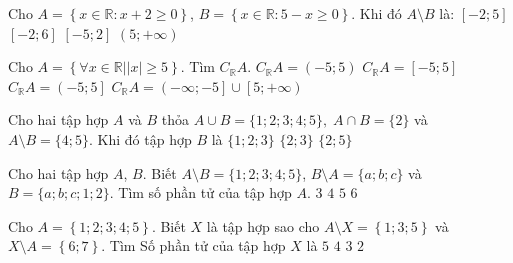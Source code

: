 \begin{ex}%
	Cho $A=\left\{x\in \mathbb{R}:x+2\geq 0\right\}$, $B=\left\{x\in \mathbb{R}:5-x\geq 0\right\}$. Khi đó $A\setminus B$ là:
	\choice
	{$\left[-2;5\right]$}
	{$\left[-2;6\right]$}
	{$\left[-5;2\right]$}
	{\True $\left(5;+\infty\right)$}
\end{ex}

\begin{ex}%
	Cho $A=\left\{\forall x\in\mathbb{R}|\left| x\right|\geq 5\right\}$. Tìm $C_{\mathbb{R}}A$.
	\choice
	{\True $C_{\mathbb{R}}A=\left(-5;5\right)$}
	{$C_{\mathbb{R}}A=\left[-5;5\right]$}
	{$C_{\mathbb{R}}A=\left(-5;5\right]$}
	{$C_{\mathbb{R}}A=\left(-\infty;-5\right]\cup\left[5;+\infty\right)$}
	\loigiai{
		Ta có $A=\left(-\infty ;-5\right]\cup\left[5;+\infty\right)\Rightarrow C_{\mathbb{R}}A=\left(-5;5\right)$.
	}
\end{ex}

\begin{ex}
Cho hai tập hợp $A$ và $B$ thỏa $A \cup B = \lbrace 1;2;3;4;5 \rbrace,\; A\cap B = \lbrace 2 \rbrace$ và $A \setminus B = \lbrace 4 ; 5 \rbrace$. Khi đó tập hợp $B$ là
\choice{$\lbrace 3 \rbrace $}
{\True $\lbrace 1;2;3 \rbrace $}
{$ \lbrace 2;3 \rbrace $}
{$\lbrace 2; 5 \rbrace $}
\end{ex}



\begin{ex}
Cho hai tập hợp $A$, $B$. Biết $A \setminus B = \{1;2;3;4;5\}$, $B \setminus A = \{a;b;c\}$ và $B= \{a;b;c;1;2\}$. Tìm số phần tử của tập hợp $A$.
\choice
{$3$}
{$4$}
{\True  $5$}
{$6$}
\end{ex}

\begin{ex}
	Cho $A=\left\{1;2;3;4;5\right\}$. Biết $X$ là tập hợp sao cho $A\setminus X=\left\{1;3;5\right\}$ và $X\setminus A=\left\{6;7\right\}$. Tìm Số phần tử của tập hợp $X$ là
	\choice
	{$5$}
	{\True $4$}
	{$3$}
	{$2$}
\end{ex}

